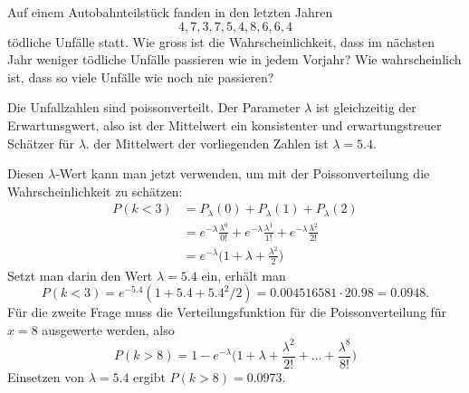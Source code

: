 Auf einem Autobahnteilstück fanden in den letzten Jahren
\[
4, 7, 3, 7, 5, 4, 8, 6, 6, 4
\]
tödliche Unfälle statt.
Wie gross ist die Wahrscheinlichkeit, dass im nächsten Jahr
weniger tödliche Unfälle passieren wie in jedem Vorjahr?
Wie wahrscheinlich ist, dass so viele Unfälle wie noch nie
passieren?


\begin{loesung}
Die Unfallzahlen sind poissonverteilt.
Der Parameter $\lambda$ ist gleichzeitig der Erwartunsgwert, also
ist der Mittelwert ein konsistenter und erwartungstreuer Schätzer
für $\lambda$. der Mittelwert der vorliegenden Zahlen ist $\lambda=5.4$.

Diesen $\lambda$-Wert kann man jetzt verwenden, um mit der Poissonverteilung
die Wahrscheinlichkeit zu schätzen:
\begin{align*}
P(k<3)&=
P_\lambda(0)
+
P_\lambda(1)
+
P_\lambda(2)
\\
&=
e^{-\lambda}\frac{\lambda^0}{0!}
+
e^{-\lambda}\frac{\lambda^1}{1!}
+
e^{-\lambda}\frac{\lambda^2}{2!}
\\
&=
e^{-\lambda}\biggl(1+\lambda+\frac{\lambda^2}{2}\biggr)
\end{align*}
Setzt man darin den Wert $\lambda=5.4$ ein, erhält man
\[
P(k<3)=e^{-5.4}(1+5.4+5.4^2/2)=0.004516581\cdot 20.98= 0.0948.
\]
Für die zweite Frage muss die Verteilungsfunktion für die
Poissonverteilung für $x=8$ ausgewerte werden, also
\[
P(k>8)=
1-e^{-\lambda}\biggl(
1+\lambda+\frac{\lambda^2}{2!}+\dots+\frac{\lambda^8}{8!}
\biggr)
\]
Einsetzen von $\lambda=5.4$ ergibt $P(k>8)=0.0973$.
\end{loesung}

